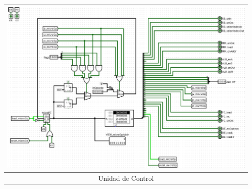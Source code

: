 \documentclass[a4paper,11pt]{article}
\begin{document}
\vspace{0.5cm}

\begin{center}
\begin{tabular}[t]{c}
\includegraphics[scale=1.4]{img/8_ControlUnit.png}\\
\hline
Unidad de Control\\ \hline
\end{tabular}
\end{center}
\end{document}
